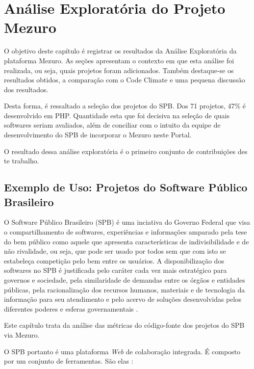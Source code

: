 \chapter{Análise Exploratória do Projeto Mezuro}\label{chap:analise_exploratoria}

O objetivo deste capítulo é registrar os resultados da Análise Exploratória da
plataforma Mezuro. As seções apresentam o contexto em que esta análise foi
realizada, ou seja, quais projetos foram adicionados. Também destaque-se os
resultados obtidos, a comparação com o Code Climate e uma pequena discussão dos
resultados.

Desta forma, é ressaltado a seleção dos projetos do SPB. Dos 71 projetos, 47\% é
desenvolvido em PHP. Quantidade esta que foi decisiva na seleção de quais
softwares seriam avaliados, além de conciliar com o intuito da equipe de
desenvolvimento do SPB de incorporar o Mezuro neste Portal.

O resultado dessa análise exploratória é o primeiro conjunto de contribuições
des te trabalho.

\section{Exemplo de Uso: Projetos do Software Público Brasileiro}

O Software Público Brasileiro (SPB) é uma inciativa do Governo Federal que visa
o compartilhamento de softwares, experiências e informações amparado pela tese
do bem público como aquele que apresenta características de indivisibilidade e
de não rivalidade, ou seja, que pode ser usado por todos sem que com isto se
estabeleça competição pelo bem entre os usuários. A disponibilização dos
softwares no SPB é justificada pelo caráter cada vez mais estratégico para
governos e sociedade, pela similaridade de demandas entre os órgãos e entidades
públicas, pela racionalização dos recursos humanos, materiais e de tecnologia
da informação para seu atendimento e pelo acervo de soluções desenvolvidas
pelos diferentes poderes e esferas governamentais \cite{santos2011in01}.

Este capítulo trata da análise das métricas do código-fonte dos projetos do SPB
via Mezuro.

O SPB portanto é uma plataforma \textit{Web} de colaboração integrada. É composto por um
conjunto de ferramentas. São elas \cite{aboutSPB}:

